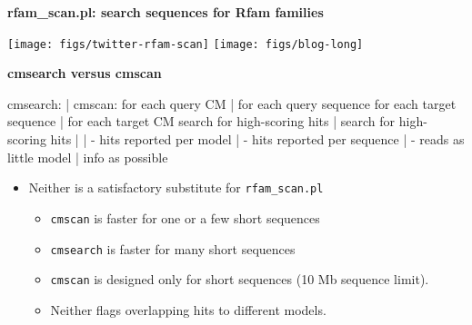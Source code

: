\documentclass[landscape]{slides}
\begin{document}
\begin{slide}
\small
\begin{center}
\textbf{rfam\_scan.pl: search sequences for Rfam families}
\end{center}

\begin{center}
\texttt{[image: figs/twitter-rfam-scan]}
\texttt{[image: figs/blog-long]}
\end{center}

\vfill
\end{slide}
\begin{slide}
\begin{center}
\textbf{cmsearch versus cmscan}
\medskip

\begin{sreoutput}
cmsearch:                                | cmscan:
   for each query CM                     |    for each query sequence
       for each target sequence          |        for each target CM
           search for high-scoring hits  |            search for high-scoring hits
                                         |
                                         |
- hits reported per model                | - hits reported per sequence
                                         | - reads as little model
                                         |   info as possible
\end{sreoutput}   

\scriptsize
\begin{itemize}
\item Neither is a satisfactory substitute for \texttt{rfam\_scan.pl}
\begin{itemize}
\item
  \texttt{cmscan} is faster for one or a few short sequences 
\item
  \texttt{cmsearch} is faster for many short sequences 
\item
  \texttt{cmscan} is designed only for short sequences (10 Mb sequence limit).
\item
  Neither flags overlapping hits to different models.
\end{itemize}
\end{itemize}
\end{center}

\vfill

\end{slide}
\end{document}
